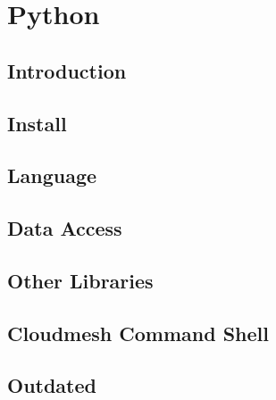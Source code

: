 

\part{Python}

\FILENAME


\chapter{Introduction}



\chapter{Install}





\chapter{Language}



\chapter{Data Access}



\chapter{Other Libraries}



\chapter{Cloudmesh Command Shell}



\chapter{Outdated}






